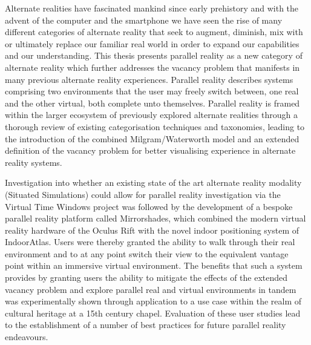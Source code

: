 Alternate realities have fascinated mankind since early prehistory and with the advent of the computer and the smartphone we have seen the rise of many different categories of alternate reality that seek to augment, diminish, mix with or ultimately replace our familiar real world in order to expand our capabilities and our understanding. This thesis presents parallel reality as a new category of alternate reality which further addresses the vacancy problem that manifests in many previous alternate reality experiences. Parallel reality describes systems comprising two environments that the user may freely switch between, one real and the other virtual, both complete unto themselves. Parallel reality is framed within the larger ecosystem of previously explored alternate realities through a thorough review of existing categorisation techniques and taxonomies, leading to the introduction of the combined Milgram/Waterworth model and an extended definition of the vacancy problem for better visualising experience in alternate reality systems.

Investigation into whether an existing state of the art alternate reality modality (Situated Simulations) could allow for parallel reality investigation via the Virtual Time Windows project was followed by the development of a bespoke parallel reality platform called Mirrorshades, which combined the modern virtual reality hardware of the Oculus Rift with the novel indoor positioning system of IndoorAtlas. Users were thereby granted the ability to walk through their real environment and to at any point switch their view to the equivalent vantage point within an immersive virtual environment. The benefits that such a system provides by granting users the ability to mitigate the effects of the extended vacancy problem and explore parallel real and virtual environments in tandem was experimentally shown through application to a use case within the realm of cultural heritage at a 15th century chapel. Evaluation of these user studies lead to the establishment of a number of best practices for future parallel reality endeavours.